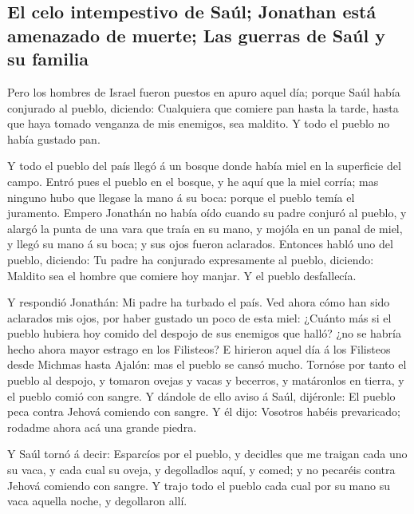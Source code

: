 \hypertarget{el-celo-intempestivo-de-sauxfal-jonathan-estuxe1-amenazado-de-muerte-las-guerras-de-sauxfal-y-su-familia}{%
\subsection{El celo intempestivo de Saúl; Jonathan está amenazado de
muerte; Las guerras de Saúl y su
familia}\label{el-celo-intempestivo-de-sauxfal-jonathan-estuxe1-amenazado-de-muerte-las-guerras-de-sauxfal-y-su-familia}}

 Pero los hombres de Israel fueron puestos en apuro aquel
día; porque Saúl había conjurado al pueblo, diciendo: Cualquiera que
comiere pan hasta la tarde, hasta que haya tomado venganza de mis
enemigos, sea maldito. Y todo el pueblo no había gustado pan.

 Y todo el pueblo del país llegó á un bosque donde había
miel en la superficie del campo.  Entró pues el pueblo en
el bosque, y he aquí que la miel corría; mas ninguno hubo que llegase la
mano á su boca: porque el pueblo temía el juramento. 
Empero Jonathán no había oído cuando su padre conjuró al pueblo, y
alargó la punta de una vara que traía en su mano, y mojóla en un panal
de miel, y llegó su mano á su boca; y sus ojos fueron aclarados.
 Entonces habló uno del pueblo, diciendo: Tu padre ha
conjurado expresamente al pueblo, diciendo: Maldito sea el hombre que
comiere hoy manjar. Y el pueblo desfallecía.

 Y respondió Jonathán: Mi padre ha turbado el país. Ved
ahora cómo han sido aclarados mis ojos, por haber gustado un poco de
esta miel:  ¿Cuánto más si el pueblo hubiera hoy comido
del despojo de sus enemigos que halló? ¿no se habría hecho ahora mayor
estrago en los Filisteos?  E hirieron aquel día á los
Filisteos desde Michmas hasta Ajalón: mas el pueblo se cansó mucho.
 Tornóse por tanto el pueblo al despojo, y tomaron ovejas
y vacas y becerros, y matáronlos en tierra, y el pueblo comió con
sangre.  Y dándole de ello aviso á Saúl, dijéronle: El
pueblo peca contra Jehová comiendo con sangre. Y él dijo: Vosotros
habéis prevaricado; rodadme ahora acá una grande piedra.

 Y Saúl tornó á decir: Esparcíos por el pueblo, y
decidles que me traigan cada uno su vaca, y cada cual su oveja, y
degolladlos aquí, y comed; y no pecaréis contra Jehová comiendo con
sangre. Y trajo todo el pueblo cada cual por su mano su vaca aquella
noche, y degollaron allí.

